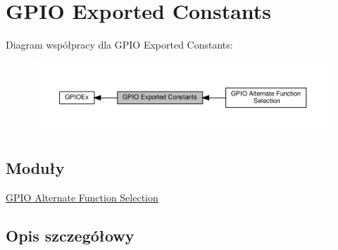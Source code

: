 \hypertarget{group___g_p_i_o_ex___exported___constants}{}\section{G\+P\+IO Exported Constants}
\label{group___g_p_i_o_ex___exported___constants}
Diagram współpracy dla G\+P\+IO Exported Constants\+:\nopagebreak
\begin{figure}[H]
\begin{center}
\leavevmode
\includegraphics[width=350pt]{group___g_p_i_o_ex___exported___constants}
\end{center}
\end{figure}
\subsection*{Moduły}
\begin{DoxyCompactItemize}
\item 
\hyperlink{group___g_p_i_o___alternate__function__selection}{G\+P\+I\+O Alternate Function Selection}
\end{DoxyCompactItemize}


\subsection{Opis szczegółowy}
